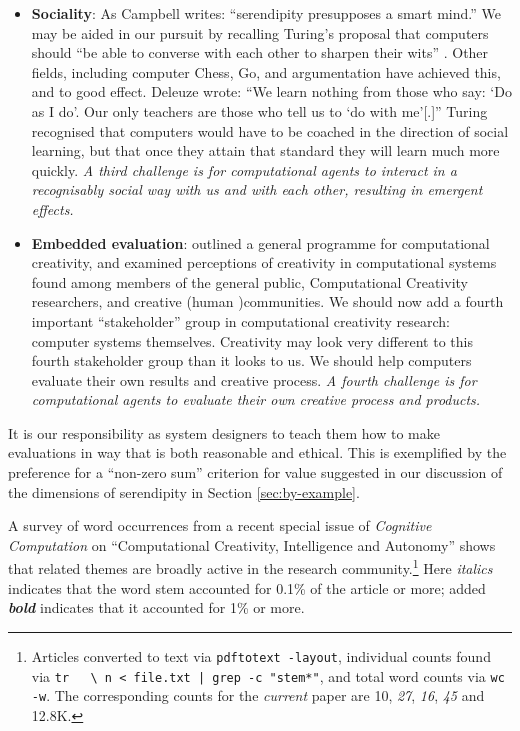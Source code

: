 \begin{itemize}
\item \textbf{Sociality}: As Campbell \citeyear{campbell2005serendipity} writes:
  ``serendipity presupposes a smart mind.''  We may be aided in our
  pursuit by recalling Turing's proposal that computers should ``be
  able to converse with each other to sharpen their wits''
  \cite{turing-intelligent}.  Other fields, including computer Chess,
  Go, and argumentation have achieved this, and to good effect.
  Deleuze \citeyear[p. 26]{deleuze1994difference} wrote: ``We learn
  nothing from those who say: `Do as I do'. Our only teachers are
  those who tell us to `do with me'[.]''  Turing recognised that
  computers would have to be coached in the direction of social
  learning, but that once they attain that standard they will learn
  much more quickly.  \emph{A third challenge is for computational
    agents to interact in a recognisably social way with us and with
    each other, resulting in emergent effects.}
\end{itemize}

\begin{itemize}
\item \textbf{Embedded evaluation}:
   outlined a general programme
  for computational creativity, and examined perceptions of creativity
  in computational systems found among members of the general public,
  Computational Creativity researchers, and creative (human )communities.  We should now add a fourth
  important ``stakeholder'' group in computational creativity
  research: computer systems themselves.  Creativity may look very
  different to this fourth stakeholder group than it looks to us.  We
  should help computers evaluate their own results and creative
  process.  \emph{A fourth challenge is for computational agents to
    evaluate their own creative process and products.}
\end{itemize}

It is our responsibility as system designers to teach them how to make
evaluations in way that is both reasonable and ethical.  This is
exemplified by the preference for a ``non-zero sum'' criterion for
value suggested in our discussion of the dimensions of serendipity in
Section \ref{sec:by-example}.

A survey of word occurrences from a recent special issue of
\emph{Cognitive Computation} on ``Computational Creativity, Intelligence and Autonomy'' \cite{bishop-erden-special-issue} shows that related themes are broadly
active in the research community.\footnote{Articles converted to text
  via {\tt pdftotext -layout}, individual counts found via {\tt tr
    \textquotesingle~\textquotesingle~\textquotesingle\textbackslash
    n\textquotesingle~< file.txt | grep -c "stem*"}, and total word counts
  via {\tt wc -w}.  The corresponding counts for the \emph{current}
  paper are 10, \emph{27}, \emph{16}, \emph{45} and 12.8K.}  Here
\emph{italics} indicates that the word stem accounted for 0.1\% of the
article or more; added \textbf{\emph{bold}} indicates that it
accounted for 1\% or more.

